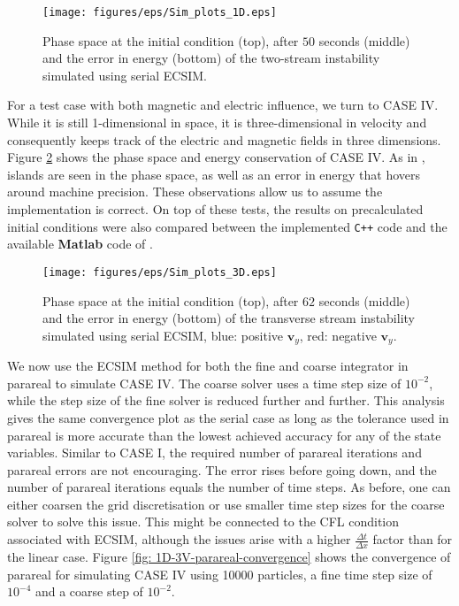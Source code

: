 \begin{figure}[h]
    \centering
    \texttt{[image: figures/eps/Sim\_plots\_1D.eps]}
    \caption{Phase space at the initial condition (top), after $50$ seconds (middle) and the error in energy (bottom) of the two-stream instability simulated using serial ECSIM.}
    \label{fig: 1D-1V-sim}
\end{figure}

For a test case with both magnetic and electric influence, we turn to CASE IV. While it is still 1-dimensional in space, it is three-dimensional in velocity and consequently keeps track of the electric and magnetic fields in three dimensions. Figure \ref{fig: 1D-3V-sim} shows the phase space and energy conservation of CASE IV. As in \cite{lapenta_advances_2023}, islands are seen in the phase space, as well as an error in energy that hovers around machine precision. These observations allow us to assume the implementation is correct. On top of these tests, the results on precalculated initial conditions were also compared between the implemented \texttt{C++} code and the available \textbf{Matlab} code of \cite{lapenta_advances_2023}.
\begin{figure}[h]
    \centering
    \texttt{[image: figures/eps/Sim\_plots\_3D.eps]}
    \caption{Phase space at the initial condition (top), after $62$ seconds (middle) and the error in energy (bottom) of the transverse stream instability simulated using serial ECSIM, blue: positive $\textbf{v}_y$, red: negative $\textbf{v}_y$.}
    \label{fig: 1D-3V-sim}
\end{figure}
We now use the ECSIM method for both the fine and coarse integrator in parareal to simulate CASE IV. The coarse solver uses a time step size of $10^{-2}$, while the step size of the fine solver is reduced further and further. This analysis gives the same convergence plot as the serial case as long as the tolerance used in parareal is more accurate than the lowest achieved accuracy for any of the state variables. Similar to CASE I, the required number of parareal iterations and parareal errors are not encouraging. The error rises before going down, and the number of parareal iterations equals the number of time steps. As before, one can either coarsen the grid discretisation or use smaller time step sizes for the coarse solver to solve this issue. This might be connected to the CFL condition associated with ECSIM, although the issues arise with a higher $\frac{\Delta t}{\Delta x}$ factor than for the linear case. 
Figure \ref{fig: 1D-3V-parareal-convergence} shows the convergence of parareal for simulating CASE IV using 10000 particles, a fine time step size of $10^{-4}$ and a coarse step of $10^{-2}$. 
